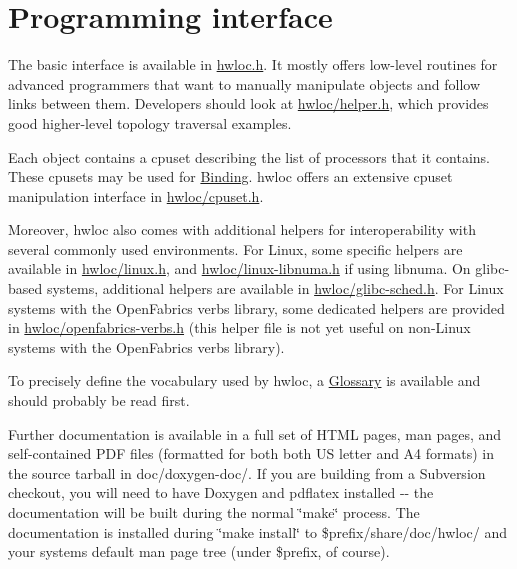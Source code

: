 

\hypertarget{index_interface}{}\section{Programming interface}\label{index_interface}
The basic interface is available in \hyperlink{hwloc_8h_source}{hwloc.h}. It mostly offers low-\/level routines for advanced programmers that want to manually manipulate objects and follow links between them. Developers should look at \hyperlink{helper_8h_source}{hwloc/helper.h}, which provides good higher-\/level topology traversal examples.

Each object contains a cpuset describing the list of processors that it contains. These cpusets may be used for \hyperlink{group__hwlocality__binding}{Binding}. hwloc offers an extensive cpuset manipulation interface in \hyperlink{cpuset_8h_source}{hwloc/cpuset.h}.

Moreover, hwloc also comes with additional helpers for interoperability with several commonly used environments. For Linux, some specific helpers are available in \hyperlink{linux_8h_source}{hwloc/linux.h}, and \hyperlink{linux-libnuma_8h_source}{hwloc/linux-\/libnuma.h} if using libnuma. On glibc-\/based systems, additional helpers are available in \hyperlink{glibc-sched_8h_source}{hwloc/glibc-\/sched.h}. For Linux systems with the OpenFabrics verbs library, some dedicated helpers are provided in \hyperlink{openfabrics-verbs_8h_source}{hwloc/openfabrics-\/verbs.h} (this helper file is not yet useful on non-\/Linux systems with the OpenFabrics verbs library).

To precisely define the vocabulary used by hwloc, a \hyperlink{glossary}{Glossary} is available and should probably be read first.

Further documentation is available in a full set of HTML pages, man pages, and self-\/contained PDF files (formatted for both both US letter and A4 formats) in the source tarball in doc/doxygen-\/doc/. If you are building from a Subversion checkout, you will need to have Doxygen and pdflatex installed -\/-\/ the documentation will be built during the normal \char`\"{}make\char`\"{} process. The documentation is installed during \char`\"{}make
install\char`\"{} to \$prefix/share/doc/hwloc/ and your systems default man page tree (under \$prefix, of course).

